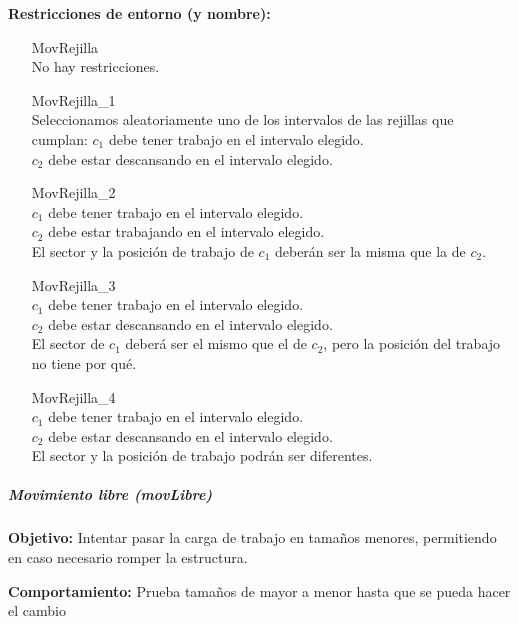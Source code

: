 \textbf{Restricciones de entorno (y nombre):}
\begin{enumerate}[align=parleft, labelsep=2cm, itemindent=5em, font=\itshape]
    \item[MovRejilla]\mbox{}\\No hay restricciones.

    \item[MovRejilla\_1]\mbox{}\\
    Seleccionamos aleatoriamente uno de los intervalos de las rejillas que cumplan:
    $c_1$ debe tener trabajo en el intervalo elegido. \\
    $c_2$ debe estar descansando en el intervalo elegido.

    \item[MovRejilla\_2]\mbox{}\\
    $c_1$ debe tener trabajo en el intervalo elegido. \\
    $c_2$ debe estar trabajando en el intervalo elegido. \\
    El sector y la posición de trabajo de $c_1$ deberán ser la misma que la de $c_2$.

    \item[MovRejilla\_3]\mbox{}\\
    $c_1$ debe tener trabajo en el intervalo elegido. \\
    $c_2$ debe estar descansando en el intervalo elegido. \\
    El sector de $c_1$ deberá ser el mismo que el de $c_2$, pero la posición del trabajo no tiene por qué.

    \item[MovRejilla\_4]\mbox{}\\
    $c_1$ debe tener trabajo en el intervalo elegido. \\
    $c_2$ debe estar descansando en el intervalo elegido. \\
    El sector y la posición de trabajo podrán ser diferentes.
\end{enumerate}

\subparagraph{Movimiento libre (\textit{movLibre})}
\label{entorno:movLibre}

\textbf{Objetivo:} Intentar pasar la carga de trabajo en tamaños menores, permitiendo en caso necesario romper la estructura.

\textbf{Comportamiento:} Prueba tamaños de mayor a menor hasta que se pueda hacer el cambio

